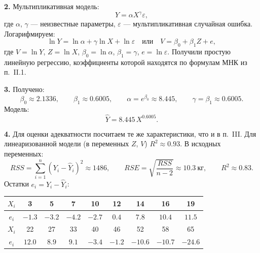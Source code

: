 \documentclass{article}
\begin{document}
    \textbf{2.} Мультипликативная модель:
    \[Y=\alpha X^{\gamma}\varepsilon,\]
    где $\alpha$, $\gamma$ --- неизвестные параметры, $\varepsilon$ --- мультипликативная случайная ошибка. Логарифмируем:
    \[\ln Y=\ln\alpha+\gamma\ln X+\ln\varepsilon\quad\text{или}\quad V=\beta_0+\beta_1Z+e,\]
    где $V=\ln Y$, $Z=\ln X$, $\beta_0=\ln\alpha$, $\beta_1=\gamma$, $e=\ln\varepsilon$. Получили простую линейную регрессию, коэффициенты которой находятся по формулам МНК из п.~II.1.

    \textbf{3.} Получено:
    \[\beta_0\approx2.1336,\qquad \beta_1\approx0.6005,\qquad \alpha=e^{\beta_0}\approx8.445,\qquad \gamma=\beta_1\approx0.6005.\]
    Модель:
    \[\hat Y=8.445\,X^{0.6005}.\]

    \begin{center}
    \end{center}

    \textbf{4.} Для оценки адекватности посчитаем те же характеристики, что и в п.~III. Для линеаризованной модели (в переменных $Z$, $V$) $R^2\approx0.93$. В исходных переменных:
    \[RSS=\sum_{i=1}^{n}(Y_i-\hat Y_i)^2\approx1486,\qquad RSE=\sqrt{\frac{RSS}{n-2}}\approx10.3\ \text{кг},\qquad R^2\approx0.83.\]
    Остатки $e_i=Y_i-\hat Y_i$:
    \begin{center}
    \begin{tabular}{|c|c|c|c|c|c|c|c|c|}
        \hline
        $X_i$ & 3 & 5 & 7 & 10 & 12 & 14 & 16 & 19 \\ \hline
        $e_i$ & $-1.3$ & $-3.2$ & $-4.2$ & $-2.7$ & $0.4$ & $7.8$ & $10.4$ & $11.5$ \\ \hline\hline
        $X_i$ & 22 & 27 & 33 & 40 & 46 & 52 & 58 & 65 \\ \hline
        $e_i$ & $12.0$ & $8.9$ & $9.1$ & $-3.4$ & $-1.2$ & $-10.6$ & $-10.7$ & $-24.6$ \\ \hline
    \end{tabular}
    \end{center}
\end{document}
